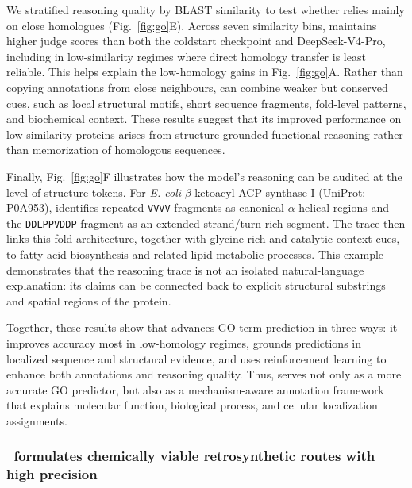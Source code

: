 We stratified reasoning quality by BLAST similarity to test whether \projName{} relies mainly on close homologues (Fig.~\ref{fig:go}E). Across seven similarity bins, \projName{} maintains higher judge scores than both the coldstart checkpoint and DeepSeek-V4-Pro, including in low-similarity regimes where direct homology transfer is least reliable. This helps explain the low-homology gains in Fig.~\ref{fig:go}A. 
Rather than copying annotations from close neighbours, \projName{} can combine weaker but conserved cues, such as local structural motifs, short sequence fragments, fold-level patterns, and biochemical context. These results suggest that its improved performance on low-similarity proteins arises from structure-grounded functional reasoning rather than memorization of homologous sequences.

Finally, Fig.~\ref{fig:go}F illustrates how the model's reasoning can be audited at the level of structure tokens. For \textit{E. coli} \(\beta\)-ketoacyl-ACP synthase I (UniProt: P0A953), \projName{} identifies repeated \texttt{VVVV} fragments as canonical \(\alpha\)-helical regions and the \texttt{DDLPPVDDP} fragment as an extended strand/turn-rich segment. 
The trace then links this fold architecture, together with glycine-rich and catalytic-context cues, to fatty-acid biosynthesis and related lipid-metabolic processes. This example demonstrates that the reasoning trace is not an isolated natural-language explanation: its claims can be connected back to explicit structural substrings and spatial regions of the protein.

Together, these results show that \projName{} advances GO-term prediction in three ways: it improves accuracy most in low-homology regimes, grounds predictions in localized sequence and structural evidence, and uses reinforcement learning to enhance both annotations and reasoning quality. Thus, \projName{} serves not only as a more accurate GO predictor, but also as a mechanism-aware annotation framework that explains molecular function, biological process, and cellular localization assignments.

\subsubsection{\projName~formulates chemically viable retrosynthetic routes with high precision
}


